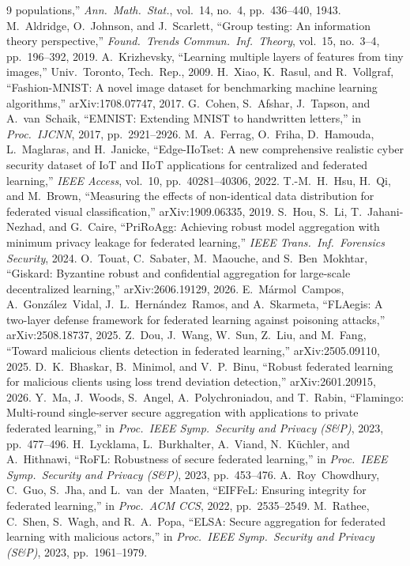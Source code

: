 \documentclass[lettersize,journal]{IEEEtran}
\begin{document}
\begin{thebibliography}{9}
populations,'' \emph{Ann.\ Math.\ Stat.}, vol.\ 14, no.\ 4, pp.\ 436--440, 1943.
 M.\ Aldridge, O.\ Johnson, and J.\ Scarlett, ``Group
testing: An information theory perspective,'' \emph{Found.\ Trends Commun.\ Inf.\
Theory}, vol.\ 15, no.\ 3--4, pp.\ 196--392, 2019.
 A.\ Krizhevsky, ``Learning multiple layers of features
from tiny images,'' Univ.\ Toronto, Tech.\ Rep., 2009.
 H.\ Xiao, K.\ Rasul, and R.\ Vollgraf, ``Fashion-MNIST: A
novel image dataset for benchmarking machine learning algorithms,''
arXiv:1708.07747, 2017.
 G.\ Cohen, S.\ Afshar, J.\ Tapson, and A.\ van~Schaik, ``EMNIST:
Extending MNIST to handwritten letters,'' in \emph{Proc.\ IJCNN}, 2017,
pp.\ 2921--2926.
 M.\ A.\ Ferrag, O.\ Friha, D.\ Hamouda, L.\ Maglaras, and
H.\ Janicke, ``Edge-IIoTset: A new comprehensive realistic cyber security dataset
of IoT and IIoT applications for centralized and federated learning,'' \emph{IEEE
Access}, vol.\ 10, pp.\ 40281--40306, 2022.
 T.-M.\ H.\ Hsu, H.\ Qi, and M.\ Brown, ``Measuring the effects
of non-identical data distribution for federated visual classification,''
arXiv:1909.06335, 2019.
 S.\ Hou, S.\ Li, T.\ Jahani-Nezhad, and G.\ Caire, ``PriRoAgg:
Achieving robust model aggregation with minimum privacy leakage for federated
learning,'' \emph{IEEE Trans.\ Inf.\ Forensics Security}, 2024.
 O.\ Touat, C.\ Sabater, M.\ Maouche, and S.\ Ben~Mokhtar,
``Giskard: Byzantine robust and confidential aggregation for large-scale decentralized
learning,'' arXiv:2606.19129, 2026.
 E.\ M\'armol~Campos, A.\ Gonz\'alez~Vidal, J.\ L.\
Hern\'andez~Ramos, and A.\ Skarmeta, ``FLAegis: A two-layer defense framework for
federated learning against poisoning attacks,'' arXiv:2508.18737, 2025.
\bibitem{safefl2025} Z.\ Dou, J.\ Wang, W.\ Sun, Z.\ Liu, and M.\ Fang, ``Toward
malicious clients detection in federated learning,'' arXiv:2505.09110, 2025.
\bibitem{flltd2026} D.\ K.\ Bhaskar, B.\ Minimol, and V.\ P.\ Binu, ``Robust federated
learning for malicious clients using loss trend deviation detection,''
arXiv:2601.20915, 2026.
\bibitem{flamingo} Y.\ Ma, J.\ Woods, S.\ Angel, A.\ Polychroniadou, and T.\ Rabin,
``Flamingo: Multi-round single-server secure aggregation with applications to private
federated learning,'' in \emph{Proc.\ IEEE Symp.\ Security and Privacy (S\&P)}, 2023,
pp.\ 477--496.
\bibitem{rofl} H.\ Lycklama, L.\ Burkhalter, A.\ Viand, N.\ K\"uchler, and A.\ Hithnawi,
``RoFL: Robustness of secure federated learning,'' in \emph{Proc.\ IEEE Symp.\ Security
and Privacy (S\&P)}, 2023, pp.\ 453--476.
\bibitem{eiffel} A.\ Roy~Chowdhury, C.\ Guo, S.\ Jha, and L.\ van~der~Maaten,
``EIFFeL: Ensuring integrity for federated learning,'' in \emph{Proc.\ ACM CCS}, 2022,
pp.\ 2535--2549.
\bibitem{elsa} M.\ Rathee, C.\ Shen, S.\ Wagh, and R.\ A.\ Popa, ``ELSA: Secure
aggregation for federated learning with malicious actors,'' in \emph{Proc.\ IEEE Symp.\
Security and Privacy (S\&P)}, 2023, pp.\ 1961--1979.
\end{thebibliography}
\end{document}
